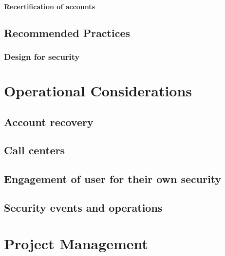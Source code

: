 \hypertarget{recertification-of-accounts}{%
\subsubsection{Recertification of
accounts}\label{recertification-of-accounts}}

\hypertarget{recommended-practices}{%
\section{Recommended Practices}\label{recommended-practices}}

\hypertarget{design-for-security}{%
\subsection{Design for security}\label{design-for-security}}

\hypertarget{operational-considerations}{%
\chapter{Operational Considerations}\label{operational-considerations}}

\hypertarget{account-recovery}{%
\section{Account recovery}\label{account-recovery}}

\hypertarget{call-centers}{%
\section{Call centers}\label{call-centers}}

\hypertarget{engagement-of-user-for-their-own-security}{%
\section{Engagement of user for their own
security}\label{engagement-of-user-for-their-own-security}}

\hypertarget{security-events-and-operations}{%
\section{Security events and
operations}\label{security-events-and-operations}}

\hypertarget{project-management}{%
\chapter{Project Management}\label{project-management}}

